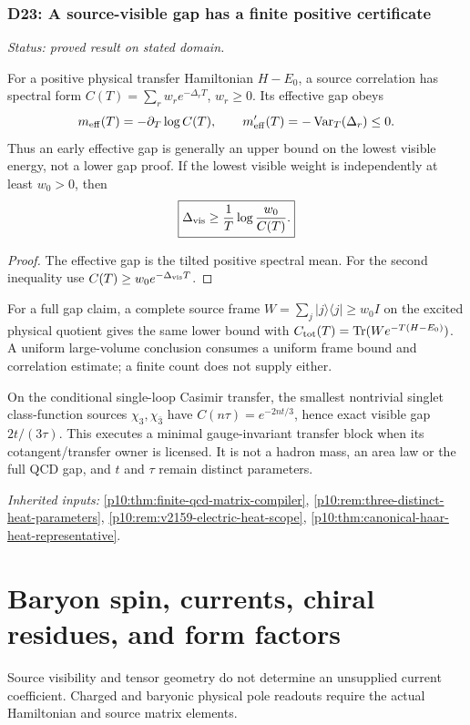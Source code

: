 \documentclass[12pt,a4paper]{article}
\begin{document}
\subsubsection{D23: A source-visible gap has a finite positive certificate}
\label{p11:sec:v2201-derived-d23}
\noindent\textit{Status: proved result on stated domain.}

For a positive physical transfer Hamiltonian $H-E_0$, a source correlation
has spectral form $C(T)=\sum_rw_re^{-\Delta_rT}$, $w_r\ge0$.
Its effective gap obeys
\[
 m_{\rm eff}(T)=-\partial_T\log C(T),\qquad
 m_{\rm eff}'(T)=-\operatorname{Var}_T(\Delta_r)\le0.
\]
Thus an early effective gap is generally an upper bound on the lowest
visible energy, not a lower gap proof. If the lowest visible weight is
independently at least $w_0>0$, then
\[
 \boxed{\Delta_{\rm vis}\ge
 \frac1T\log\frac{w_0}{C(T)}.}
\]
\begin{proof}
The effective gap is the tilted positive spectral mean.
For the second inequality use $C(T)\ge w_0e^{-\Delta_{\rm vis}T}$.
\end{proof}
For a full gap claim, a complete source frame
$W=\sum_j|j\rangle\langle j|\ge w_0I$ on the excited physical quotient
gives the same lower bound with
$C_{\rm tot}(T)=\operatorname{Tr}(We^{-T(H-E_0)})$.
A uniform large-volume conclusion consumes a uniform frame bound and
correlation estimate; a finite count does not supply either.

On the conditional single-loop Casimir transfer, the smallest nontrivial
singlet class-function sources $\chi_3,\chi_{\bar3}$ have
$C(n\tau)=e^{-2nt/3}$, hence exact visible gap $2t/(3\tau)$.
This executes a minimal gauge-invariant transfer block when its
cotangent/transfer owner is licensed. It is not a hadron mass, an area law
or the full QCD gap, and $t$ and $\tau$ remain distinct parameters.
\par\noindent\textit{Inherited inputs:} \ref{p10:thm:finite-qcd-matrix-compiler}, \ref{p10:rem:three-distinct-heat-parameters}, \ref{p10:rem:v2159-electric-heat-scope}, \ref{p10:thm:canonical-haar-heat-representative}.



\section{Baryon spin, currents, chiral residues, and form factors}
\label{p11:sec:v237-b4}
Source visibility and tensor geometry do not determine an unsupplied current coefficient. Charged and baryonic physical pole readouts require the actual Hamiltonian and source matrix elements.
\end{document}
